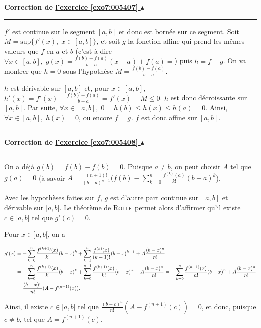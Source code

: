 \documentclass[11pt,a4paper]{article}
\newcommand{\finexercice}{}
\newcommand{\noindication}{}
\newcounter{exo}
\newcommand{\correction}[1]{\hypertarget{cor7:#1}{}\label{cor7:#1}{\bf Correction de \hyperlink{exo7:#1}{l'exercice \ref{exo7:#1} $\blacktriangle$}}\vspace{1mm}\hrule\vspace{1mm}}
\newcommand{\fincorrection}{\vspace{1mm}\hrule\vspace*{7mm}}
\newcommand{\finenonces}{\newpage}
\newcommand{\finindications}{\newpage}
\begin{document}
\finexercice
\finfiche


 \finenonces 



 \finindications 

\noindication
\noindication
\noindication
\noindication
\noindication
\noindication
\noindication
\noindication
\noindication
\noindication
\noindication
\noindication
\noindication
\noindication
\noindication
\noindication
\noindication
\noindication
\noindication


\newpage

\correction{005407}
$f'$ est continue sur le segment $[a,b]$ et donc est bornée sur ce segment. Soit $M=\mbox{sup}\{f'(x),\;x\in[a,b]\}$, et soit $g$ la fonction affine qui prend les mêmes valeurs que $f$ en $a$ et $b$ (c'est-à-dire $\forall x\in[a,b],\;g(x)=\frac{f(b)-f(a)}{b-a}(x-a)+f(a)=$) puis $h=f-g$. On va montrer que $h=0$ sous l'hypothèse $M=\frac{f(b)-f(a)}{b-a}$.

$h$ est dérivable sur $[a,b]$ et, pour $x\in[a,b]$, $h'(x)=f'(x)-\frac{f(b)-f(a)}{b-a}=f'(x)-M\leq0$. $h$ est donc décroissante sur $[a,b]$. Par suite, $\forall x\in[a,b],\;0=h(b)\leq h(x)\leq h(a)=0$. Ainsi, $\forall x\in[a,b],\;h(x)=0$, ou encore $f=g$. $f$ est donc affine sur $[a,b]$.
\fincorrection
\correction{005408}
On a déjà $g(b)=f(b)-f(b)=0$. Puisque $a\neq b$, on peut choisir $A$ tel que $g(a)=0$ (à savoir $A=\frac{(n+1)!}{(b-a)^{n+1}}(f(b)-\sum_{k=0}^{n}\frac{f^{(k)}(a)}{k!}(b-a)^k$).

Avec les hypothèses faites sur $f$, $g$ est d'autre part continue sur $[a,b]$ et dérivable sur $]a,b[$. Le théorème de \textsc{Rolle} permet alors d'affirmer qu'il existe $c\in]a,b[$ tel que $g'(c)=0$.

Pour $x\in]a,b[$, on a

\begin{align*}\ensuremath
g'(x)&=-\sum_{k=0}^{n}\frac{f^{(k+1)}(x)}{k!}(b-x)^k+\sum_{k=1}^{n}\frac{f^{(k)}(x)}{(k-1)!}(b-x)^{k-1}
+A\frac{(b-x)^n}{n!}\\
 &=-\sum_{k=0}^{n}\frac{f^{(k+1)}(x)}{k!}(b-x)^k+\sum_{k=0}^{n-1}\frac{f^{(k+1)}(x)}{k!}(b-x)^{k}
+A\frac{(b-x)^n}{n!}=-\sum_{k=0}^{n}\frac{f^{(n+1)}(x)}{n!}(b-x)^n+A\frac{(b-x)^n}{n!}\\
 &=\frac{(b-x)^n}{n!}(A-f^{(n+1)}(x)).
\end{align*}

Ainsi, il existe $c\in]a,b[$ tel que $\frac{(b-c)^n}{n!}(A-f^{(n+1)}(c))=0$, et donc, puisque $c\neq b$, tel que $A=f^{(n+1)}(c)$.
\end{document}
